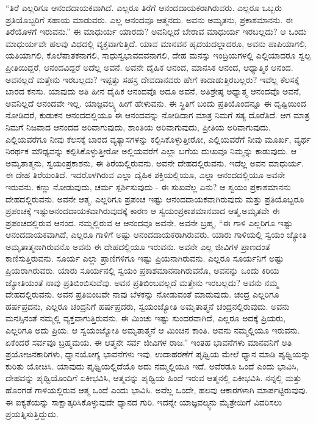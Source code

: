 “ತಿರೆ ಎಲ್ಲರಿಗೂ ಆನಂದದಾಯಕವಾಗಿದೆ. ಎಲ್ಲರೂ ತಿರೆಗೆ ಆನಂದದಾಯಕರಾಗಿರುವರು. ಎಲ್ಲರೂ ಒಬ್ಬರು ಪ್ರತಿಯೊಬ್ಬರಿಗೆ ಸಹಾಯ ಮಾಡುವರು. ಎಲ್ಲ ಆನಂದವೂ ಆತ್ಮನದು. ಅವನು ಅಮೃತನು, ಪ್ರಕಾಶಮಾನನು. ಈ ತಿರೆಯೊಳಗೆ ಇರುವನು.” ಈ ಮಾಧುರ್ಯ ಯಾರದು? ಅವನಿಲ್ಲದೆ ಬೇರಾವ ಮಾಧುರ್ಯ ಇರಬಲ್ಲದು? ಆ ಒಂದು ಮಾಧುರ್ಯವೇ ಹಲವು ವಿಧದಲ್ಲಿ ವ್ಯಕ್ತವಾಗುತ್ತಿದೆ. ಯಾವ ಮಾನವನ ಹೃದಯದಲ್ಲಾದರೂ, ಅವನು ಪಾಪಿಯಾಗಲಿ, ಯತಿಯಾಗಲಿ, ಕೊಲೆಪಾತಕನಾಗಲಿ, ಸಾಧುಸ್ವಭಾವದವನಾಗಲಿ, ದೇಹ ಮನಸ್ಸು ಇಂದ್ರಿಯಗಳಲ್ಲಿ ಎಲ್ಲಿಯಾದರೂ ಸ್ವಲ್ಪ ಪ್ರೀತಿಯಿದ್ದರೆ, ಆನಂದವಿದ್ದರೆ ಅದೆಲ್ಲ ಅವನೆ. ಅವನೇ ದೈಹಿಕ ಆನಂದ, ಮಾನಸಿಕ ಆನಂದ, ಆಧ್ಯಾತ್ಮಿಕ ಆನಂದ. ಅವನಲ್ಲದೆ ಮತ್ತೇನು ಇರಬಲ್ಲದು? ಇಪ್ಪತ್ತು ಸಹಸ್ರ ದೇವದಾನವರು ಹೇಗೆ ಕಾದಾಡುತ್ತಿರಬಲ್ಲರು? ಇವೆಲ್ಲ ಕೆಲಸಕ್ಕೆ ಬಾರದ ಕನಸು. ಯಾವುದು ಅತಿ ಹೀನ ದೈಹಿಕ ಆನಂದವೊ ಅದೂ ಅವನೆ, ಅತಿಶ್ರೇಷ್ಠ ಅಧ್ಯಾತ್ಮ ಆನಂದವೊ ಅವನೆ, ಅವನಿಲ್ಲದೆ ಆನಂದವೇ ಇಲ್ಲ. ಯಾಜ್ಞವಲ್ಕ್ಯ ಹೀಗೆ ಹೇಳುವನು. ಈ ಸ್ಥಿತಿಗೆ ಬಂದು ಪ್ರತಿಯೊಂದನ್ನೂ ಈ ದೃಷ್ಟಿಯಿಂದ ನೋಡಿದರೆ, ಕುಡುಕನ ಆನಂದದಲ್ಲಿಯೂ ಈ ಆನಂದವನ್ನು ನೋಡಿದಾಗ ಮಾತ್ರ ನಿಮಗೆ ಸತ್ಯ ದೊರೆತಿದೆ. ಆಗ ಮಾತ್ರ ನಿಮಗೆ ನಿಜವಾದ ಆನಂದದ ಅರಿವಾಗುವುದು, ಶಾಂತಿಯ ಅರಿವಾಗುವುದು, ಪ್ರೀತಿಯ ಅರಿವಾಗುವುದು. ಎಲ್ಲಿಯವರೆಗೂ ನೀವು ಕೆಲಸಕ್ಕೆ ಬಾರದ ವ್ಯತ್ಯಾಸಗಳನ್ನು ಕಲ್ಪಿಸಿಕೊಳ್ಳುತ್ತೀರೋ, ಎಲ್ಲಿಯವರೆಗೆ ನೀವು ಮೂರ್ಖ, ವ್ಯರ್ಥ ನಿರರ್ಥಕ ಮೌಢ್ಯವನ್ನು ಕಲ್ಪಿಸಿಕೊಳ್ಳುತ್ತೀರೋ ಅಲ್ಲಿಯವರೆಗೆ ಎಲ್ಲಾ ಬಗೆಯ ದುಃಖವೂ ನಿಮ್ಮನ್ನು ಕಾಡುವುದು. ಆ ಅಮೃತಾತ್ಮನು, ಸ್ವಯಂಪ್ರಕಾಶನು, ಈ ತಿರೆಯಲ್ಲಿರುವನು. ಅವನೇ ದೇಹದಲ್ಲಿರುವನು. ಇದೆಲ್ಲ ಅವನ ಮಾಧುರ್ಯ. ಈ ದೇಹ ತಿರೆಯಂತಿದೆ. ಇದರೊಳಗಿರುವ ಎಲ್ಲಾ ದೈಹಿಕ ಶಕ್ತಿಯಲ್ಲಿಯೂ, ಎಲ್ಲಾ ಆನಂದದಲ್ಲಿಯೂ ಅವನೇ ಇರುವನು. ಕಣ್ಣು ನೋಡುವುದು, ಚರ್ಮ ಸ್ಪರ್ಶಿಸುವುದು - ಈ ಸುಖವೆಲ್ಲ ಏನು? ಆ ಸ್ವಯಂ ಪ್ರಕಾಶಮಾನನು ದೇಹದಲ್ಲಿರುವನು. ಅವನೇ ಆತ್ಮ. ಎಲ್ಲರಿಗೂ ಪ್ರಪಂಚ ಇಷ್ಟು ಆನಂದದಾಯಕವಾಗಿರುವುದು ಮತ್ತು ಪ್ರತಿಯೊಬ್ಬರೂ ಪ್ರಪಂಚಕ್ಕೆ ಇಷ್ಟು\break ಆನಂದದಾಯಕವಾಗಿರುವುದಕ್ಕೆ ಕಾರಣ ಆ ಸ್ವಯಂಪ್ರಕಾಶಮಾನವಾದ ಆತ್ಮ.\break ಅಮೃತವೇ ಈ ಪ್ರಪಂಚದಲ್ಲಿರುವ ಆನಂದ. ನಮ್ಮಲ್ಲಿರುವ ಆ ಆನಂದವೂ ಅವನೇ. ಅವನೇ ಬ್ರಹ್ಮ, “ಈ ಗಾಳಿ ಎಲ್ಲರಿಗೂ ಇಷ್ಟು ಆನಂದದಾಯಕವಾಗಿದೆ, ಎಲ್ಲರೂ ಗಾಳಿಗೆ ಅಷ್ಟು ಆನಂದದಾಯಕರಾಗಿರುವರು. ಯಾರು ಗಾಳಿಯಲ್ಲಿ ಸ್ವಯಂ ಜ್ಯೋತಿ ಅಮೃತಾತ್ಮನಾಗಿರುವನೊ ಅವನು ಈ ದೇಹದಲ್ಲಿಯೂ ಇರುವನು. ಅವನೇ ಎಲ್ಲ ಜೀವಿಗಳ ಪ್ರಾಣದಂತೆ ಕಾಣಿಸುತ್ತಿರುವನು. ಸೂರ್ಯ ಎಲ್ಲಾ ಪ್ರಾಣಿಗಳಿಗೂ ಇಷ್ಟು ಪ್ರಿಯನಾಗಿರುವನು. ಎಲ್ಲರೂ ಸೂರ್ಯನಿಗೆ ಅಷ್ಟು ಪ್ರಿಯರಾಗಿರುವರು. ಯಾರು ಸೂರ್ಯನಲ್ಲಿ ಸ್ವಯಂ ಪ್ರಕಾಶಮಾನನಾಗಿರುವನೊ, ಅವನನ್ನು ಒಂದು ಕಿರಿಯ ಜ್ಯೋತಿಯಂತೆ ನಾವು ಪ್ರತಿಬಿಂಬಿಸುವೆವು. ಅವನ ಪ್ರತಿಬಿಂಬವಲ್ಲದೆ ಮತ್ತೇನು ಇರಬಲ್ಲದು? ಅವನು ನಮ್ಮ ದೇಹದಲ್ಲಿರುವನು. ಅವನ ಪ್ರತಿಬಿಂಬವೇ ನಾವು ಬೆಳಕನ್ನು ನೋಡುವಂತೆ ಮಾಡುವುದು. ಚಂದ್ರ ಎಲ್ಲರಿಗೂ ಹರ್ಷಪ್ರದನು, ಎಲ್ಲರೂ ಚಂದ್ರನಿಗೆ ಹರ್ಷಪ್ರದರು, ಸ್ವಯಂಜ್ಯೋತಿ ಅಮೃತಾತ್ಮನೆ ಚಂದ್ರನಲ್ಲಿರುವುದು. ಅವನು ಮನಸ್ಸಿನಂತೆ ನಮ್ಮಲ್ಲಿ ವ್ಯಕ್ತವಾಗುತ್ತಿರುವನು. ಈ ಮಿಂಚು ಇಷ್ಟು ಸುಂದರವಾಗಿದೆ, ಎಲ್ಲರೂ ಅದಕ್ಕೆ ಪ್ರಿಯರು, ಎಲ್ಲರಿಗೂ ಅದು ಪ್ರಿಯ. ಆ ಸ್ವಯಂಜ್ಯೋತಿ ಅಮೃತಾತ್ಮನೆ ಆ ಮಿಂಚಿನ ಕಾಂತಿ. ಅವನು ನಮ್ಮಲ್ಲಿಯೂ ಇರುವನು. ಏಕೆಂದರೆ ಸರ್ವವೂ ಬ್ರಹ್ಮಮಯ. ಈ ಆತ್ಮನೇ ಸರ್ವ ಜೀವಿಗಳ ರಾಜ.” ಇಂತಹ ಭಾವನೆಗಳು ಮಾನವನಿಗೆ ಅತಿ ಪ್ರಯೋಜನಕಾರಿಗಳು, ಧ್ಯಾನಯೋಗ್ಯ ಭಾವನೆಗಳು ಇವು. ಉದಾಹರಣೆಗೆ ಪೃಥ್ವಿಯ ಮೇಲೆ ಧ್ಯಾನ ಮಾಡಿ ಪೃಥ್ವಿಯನ್ನು ಕುರಿತು ಯೋಚಿಸಿ. ಯಾವುದು ಪೃಥ್ವಿಯಲ್ಲಿದೆಯೊ ಅದು ನಮ್ಮಲ್ಲಿಯೂ ಇದೆ. ಅವೆರಡೂ ಒಂದೆ ಎಂದು ಭಾವಿಸಿ, ದೇಹವನ್ನು ಪೃಥ್ವಿಯೊಂದಿಗೆ ಏಕೀಭವಿಸಿ, ಆತ್ಮವನ್ನು ಪೃಥ್ವಿಯ ಹಿಂದೆ ಇರುವ ಆತ್ಮನಲ್ಲಿ ಏಕೀಭವಿಸಿ. ನನ್ನಲ್ಲಿ ಮತ್ತು ಹೊರಗಡೆ ಗಾಳಿಯಲ್ಲಿರುವ ಆತ್ಮ ಒಂದೆ ಎಂದು ಭಾವಿಸಿ. ಅವೆಲ್ಲ ಒಂದೇ, ಹಲವು ಆಕಾರಗಳಾಗಿ ಮಾರ್ಪಟ್ಟಿರುವುವು. ಈ ಐಕ್ಯತೆಯನ್ನು ಸಾಕ್ಷಾತ್ಕರಿಸಿಕೊಳ್ಳುವುದೇ ಧ್ಯಾನದ ಗುರಿ. ಇದನ್ನೇ ಯಾಜ್ಞವಲ್ಕ್ಯನು ಮೈತ್ರೇಯಿಗೆ ವಿವರಿಸಲು ಪ್ರಯತ್ನಿಸುತ್ತಿದ್ದುದು.

